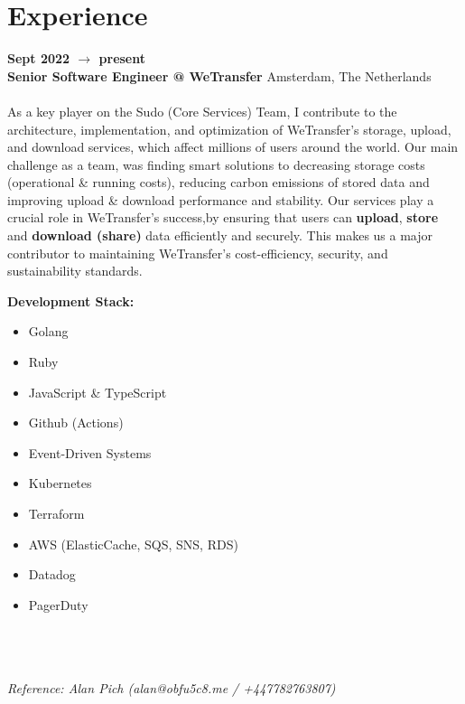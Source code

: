 \documentclass[]{friggeri-cv} %
\renewcommand{\entry}[4]{%
  \textbf{#1} \\
\textbf{#2}%
    \hfill%
    {\footnotesize\addfontfeature{Color=lightgray} #3}\\%
    #4\vspace{\parsep}%
}
\begin{document}
\section{Experience}
\entry
{Sept 2022 $\rightarrow$  present}
{\normalfont Senior Software Engineer @ \textbf{WeTransfer}}
{Amsterdam, The Netherlands}
{\textbf{} \\
As a key player on the Sudo (Core Services) Team, I contribute to the architecture, implementation, and optimization of WeTransfer's storage, upload, and download services, which affect millions of users around the world. Our main challenge as a team, was finding smart solutions to decreasing storage costs (operational \& running costs), reducing carbon emissions of stored data and improving upload \& download performance and stability. Our services play a crucial role in WeTransfer's success,by ensuring that users can \textbf{upload}, \textbf{store} and \textbf{download (share)} data efficiently and securely. This makes us a major contributor to maintaining WeTransfer's cost-efficiency, security, and sustainability standards.

\textbf{Development Stack:}\\
\begin{minipage}[t]{0.5\textwidth}
  \begin{itemize}
      \item Golang
      \item Ruby
      \item JavaScript \& TypeScript
      \item Github (Actions)
      \item Event-Driven Systems
  \end{itemize}
\end{minipage}%
%
\begin{minipage}[t]{0.5\textwidth}
  \begin{itemize}
      \item Kubernetes
      \item Terraform
      \item AWS (ElasticCache, SQS, SNS, RDS)
      \item Datadog
      \item PagerDuty
  \end{itemize}
\end{minipage}%
}
\\\\\\
\emph{Reference: Alan Pich (alan@obfu5c8.me / +447782763807)}
\end{document}
